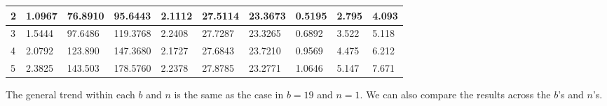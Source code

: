 \documentclass[11pt]{article}
\begin{document}
\begin{table}[H]
\begin{tabular}{|l|l|l|l|l|l|l|l|l|l|}
2                     & 1.0967                                                    & 76.8910                                                   & 95.6443                                                     & 2.1112                                                    & 27.5114                                                   & 23.3673                                                     & 0.5195                                                    & 2.795                                                     & 4.093                                                       \\ \hline
3                     & 1.5444                                                    & 97.6486                                                   & 119.3768                                                    & 2.2408                                                    & 27.7287                                                   & 23.3265                                                     & 0.6892                                                    & 3.522                                                     & 5.118                                                       \\ \hline
4                     & 2.0792                                                    & 123.890                                                   & 147.3680                                                    & 2.1727                                                    & 27.6843                                                   & 23.7210                                                     & 0.9569                                                    & 4.475                                                     & 6.212                                                       \\ \hline
5                     & 2.3825                                                    & 143.503                                                   & 178.5760                                                    & 2.2378                                                    & 27.8785                                                   & 23.2771                                                     & 1.0646                                                    & 5.147                                                     & 7.671                                                       \\ \hline
\end{tabular}
\end{table} 
The general trend within each $b$ and $n$ is the same as the case in $b = 19$ and $n = 1$. We can also compare the results across the $b$'s and $n$'s. \\
\end{document}
